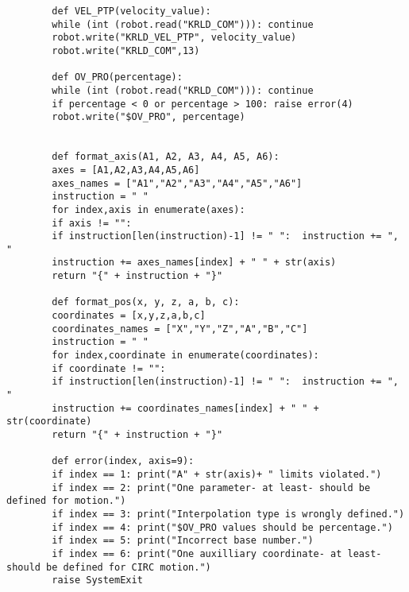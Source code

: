 \documentclass{book}
\begin{document}
\begin{verbatim}
		def VEL_PTP(velocity_value):
		while (int (robot.read("KRLD_COM"))): continue
		robot.write("KRLD_VEL_PTP", velocity_value)
		robot.write("KRLD_COM",13)
		
		def OV_PRO(percentage):
		while (int (robot.read("KRLD_COM"))): continue
		if percentage < 0 or percentage > 100: raise error(4)
		robot.write("$OV_PRO", percentage)
		
		
		def format_axis(A1, A2, A3, A4, A5, A6):
		axes = [A1,A2,A3,A4,A5,A6]
		axes_names = ["A1","A2","A3","A4","A5","A6"]
		instruction = " "
		for index,axis in enumerate(axes):
		if axis != "":
		if instruction[len(instruction)-1] != " ":	instruction += ", "
		instruction += axes_names[index] + " " + str(axis)
		return "{" + instruction + "}"
		
		def format_pos(x, y, z, a, b, c):
		coordinates = [x,y,z,a,b,c]
		coordinates_names = ["X","Y","Z","A","B","C"]
		instruction = " "
		for index,coordinate in enumerate(coordinates):
		if coordinate != "":
		if instruction[len(instruction)-1] != " ":	instruction += ", "
		instruction += coordinates_names[index] + " " + str(coordinate)
		return "{" + instruction + "}"
		
		def error(index, axis=9):
		if index == 1: print("A" + str(axis)+ " limits violated.")
		if index == 2: print("One parameter- at least- should be defined for motion.")
		if index == 3: print("Interpolation type is wrongly defined.")
		if index == 4: print("$OV_PRO values should be percentage.")
		if index == 5: print("Incorrect base number.")
		if index == 6: print("One auxilliary coordinate- at least- should be defined for CIRC motion.")
		raise SystemExit
		\end{verbatim}
	
	\newpage
\end{document}
